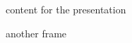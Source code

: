 \documentclass[handout]{beamer}
\begin{document}
\begin{frame}
    content for the presentation
\end{frame}

\begin{frame}
    another frame
\end{frame}
\end{document}
